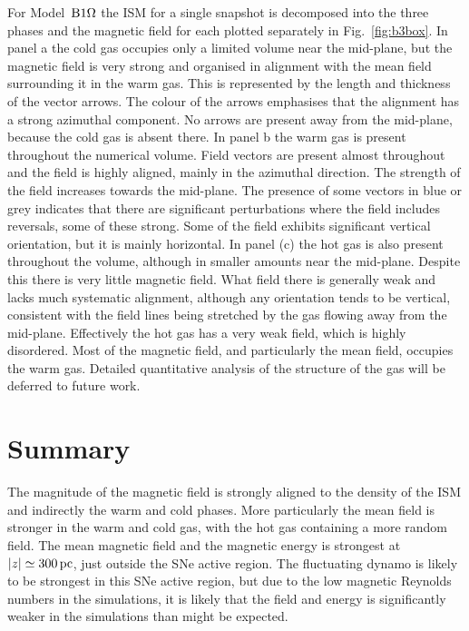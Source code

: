   For Model~${\mathrm{B}1\rm{\Omega} }$ the ISM for a single snapshot is decomposed into the 
  three phases and the magnetic field for each plotted separately in 
  Fig.~\ref{fig:b3box}.
  In panel a the cold gas occupies only a limited volume near the mid-plane, 
  but the magnetic field is very strong and organised in alignment with the
  mean field surrounding it in the warm gas. 
  This is represented by the length and thickness of the vector arrows.  
  The colour of the arrows emphasises that the alignment has a strong 
  azimuthal component. 
  No arrows are present away from the mid-plane, because the cold gas is absent 
  there.
  In panel b the warm gas is present throughout the numerical volume.
  Field vectors are present almost throughout and the field is highly aligned,
  mainly in the azimuthal direction. 
  The strength of the field increases towards the mid-plane.
  The presence of some vectors in blue or grey indicates that there are 
  significant perturbations where the field includes reversals, some of these
  strong.
  Some of the field exhibits significant vertical orientation, but it is 
  mainly horizontal.
  In panel (c) the hot gas is also present throughout the volume, although 
  in smaller amounts near the mid-plane. 
  Despite this there is very little magnetic field.
  What field there is generally weak and lacks much systematic alignment, 
  although any orientation tends to be vertical, consistent with the
  field lines being stretched by the gas flowing away from the mid-plane. 
  Effectively the hot gas has a very weak field, which is highly disordered.
  Most of the magnetic field, and particularly the mean field, occupies the 
  warm gas.
  Detailed quantitative analysis of the structure of the gas will be deferred to
  future work.


  \section{Summary}
  The magnitude of the magnetic field is strongly aligned to the density of the
  ISM and indirectly the warm and cold phases.
  More particularly the mean field is stronger in the warm and cold gas, with 
  the hot gas containing a more random field. 
  The mean magnetic field and the magnetic energy is strongest at 
  $|z|\simeq300\,{\rm pc}$, just outside the SNe active region. 
  The fluctuating dynamo is likely to be strongest in this SNe active region,
  but due to the low magnetic Reynolds numbers in the simulations, it is likely
  that the field and energy is significantly weaker in the simulations than 
  might be expected.




